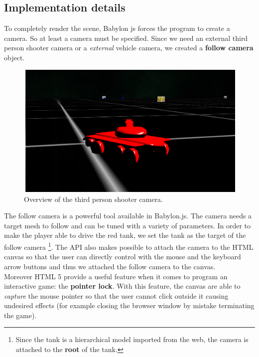 \documentclass[14pt]{article}
\begin{document}
\subsection{Implementation details}
To completely render the scene, Babylon js forces the program to create a camera. So at least a camera must be specified. Since we need an external third person shooter camera or a \textit{external} vehicle camera, we created a \textbf{follow camera} object.
\begin{figure}[H]
\includegraphics[width = 12cm]{images/thirdPerson.png}
\caption{Overview of the third person shooter camera.}
\label{img:thirdPerson}
\end{figure}
The follow camera is a powerful tool available in Babylon.js. The camera needs a target mesh to follow and can be tuned with a variety of parameters. In order to make the player able to drive the red tank, we set the tank as the target of the follow camera \footnote{Since the tank is a hierarchical model imported from the web, the camera is attached to the \textbf{root} of the tank.}. The API also makes possible to attach the camera to the HTML canvas so that the user can directly control with the mouse and the keyboard arrow buttons and thus we attached the follow camera to the canvas. \\
Moreover HTML 5 provide a useful feature when it comes to program an interactive game: the \textbf{pointer lock}. With this feature, the canvas are able to \textit{capture} the mouse pointer so that the user cannot click outside it causing undesired effects (for example closing the browser window by mistake terminating the game).
\end{document}
